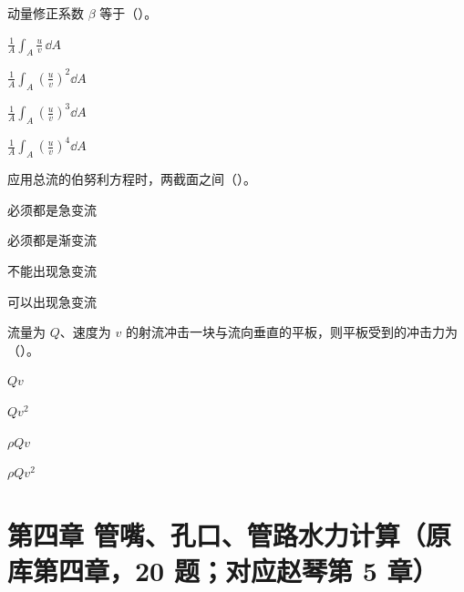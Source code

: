 \begin{ti}
\item[3-19] 动量修正系数 $\beta$ 等于（\quad）。
\begin{choices}
\item $\displaystyle\frac{1}{A}\int_A\frac{u}{v}\,\dd A$
\item $\displaystyle\frac{1}{A}\int_A\left(\frac{u}{v}\right)^2\dd A$
\item $\displaystyle\frac{1}{A}\int_A\left(\frac{u}{v}\right)^3\dd A$
\item $\displaystyle\frac{1}{A}\int_A\left(\frac{u}{v}\right)^4\dd A$
\end{choices}

\item[3-20] 应用总流的伯努利方程时，两截面之间（\quad）。
\begin{choices}
\item 必须都是急变流
\item 必须都是渐变流
\item 不能出现急变流
\item 可以出现急变流
\end{choices}

\item[3-21] 流量为 $Q$、速度为 $v$ 的射流冲击一块与流向垂直的平板，则平板受到的冲击力为（\quad）。
\begin{choices}
\item $Qv$
\item $Qv^2$
\item $\rho Qv$
\item $\rho Qv^2$
\end{choices}

\end{ti}

\section*{第四章 管嘴、孔口、管路水力计算（原库第四章，20 题；对应赵琴第 5 章）}


